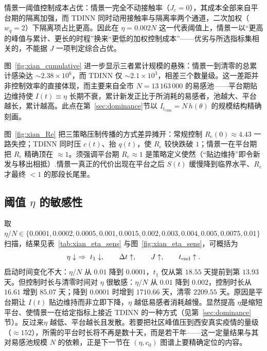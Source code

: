 \documentclass[lang=cn,a4paper,newtx]{elegantpaper}
\numberwithin{equation}{section}
\theoremstyle{plain}
\newcommand{\Itcum}{I_{t_{\mathrm{cum}}}}
\begin{document}
情景一阈值控制成本占优：情景一完全不动接触率（$J_c=0$），其成本全部来自平台期的隔离加强，而 TDINN 同时动用接触率与隔离率两个通道，二次加权（$w_q=2$）下隔离项占比更高。因此在 $\eta=0.002N$ 这一代表阈值上，情景一以“更高的峰值与累计、更长的时程”换来“更低的加权控制成本”——优劣与所选指标集相关的，不能据 $J$ 一项判定综合占优。

图~\ref{fig:xian_cumulative} 进一步显示三者累计规模的悬殊：情景一到清零的总累计感染达 $\sim2.38\times10^{6}$，而 TDINN 仅 $\sim2.1\times10^{3}$，相差三个数量级。这一差距并非控制效率的直接体现，而主要来自全市 $N=13\,163\,000$ 的易感池——平台期贴边维持使 $I(t)\equiv\eta$ 长期不衰，累计新发正比于所消耗的易感者，池越大、平台越长，累计越高。此点在第~\ref{sec:dominance}节以 $\Itcum=N\,h(\theta)$ 的规模结构精确刻画。

图~\ref{fig:xian_Re} 把三策略压制传播的方式差异摊开：常规控制 $R_e(0)\approx4.43$ 一路失控；TDINN 同时压 $c(t)$、抬 $q(t)$，使 $R_e$ 较快跌破 $1$；情景一在平台期把 $R_e$ 精确顶在 $\approx1$。须强调平台期 $R_e\approx1$ 是策略定义使然（“贴边维持”即令新发与移出相抵）.情景一真正的代价出现在平台之后 $S(t)$ 缓慢降到临界水平、$R_e$ 才最终 $<1$ 的那段长尾里。

\subsection{阈值 \texorpdfstring{$\eta$}{eta} 的敏感性}
取 $\eta/N\in\{0.0001,0.0002,0.0005,0.001,0.0015,0.002,0.003,0.004,0.005,0.0075,0.01\}$ 扫描，结果见表~\ref{tab:xian_eta_sens} 与图~\ref{fig:xian_eta_sens}，可概括为
\[
\eta\downarrow\ \Rightarrow\ t_1\downarrow,\qquad \Delta t\uparrow,\qquad J\uparrow,\qquad t_{\rm end}\uparrow.
\]
启动时间变化不大：$\eta/N$ 从 $0.01$ 降到 $0.0001$，$t_1$ 仅从第 $18.55$ 天提前到第 $13.93$ 天。但控制时长与清零时间对 $\eta$ 很敏感：$\eta/N$ 从 $0.01$ 降到 $0.002$，控制时长从 $16.61$ 增到 $85.07$ 天；降到 $0.0001$ 时增到 $1710.66$ 天，清零 $2209.55$ 天。原因是平台期让 $I(t)$ 贴边维持而非立即下降，$\eta$ 越低易感者消耗越慢。显然提高 $\eta$是缩短平台、使情景一在给定指标上接近 TDINN 的一种方式（见第~\ref{sec:dominance}节）。反过来$\eta$ 越低、平台越长且发散。若要把社区峰值压到西安真实疫情的量级（$\approx152$），所需的平台时长将不再是数十天，而是若干年——这一定量结果与其对易感池规模 $N$ 的依赖，正是下一节在 $(\eta,c_0)$ 图谱上要精确定位的内容。

\begin{table}[htbp]
    \centering
    \footnotesize
    \caption{不同医疗阈值 $\eta$ 下情景一阈值控制的数值指标。}
    \label{tab:xian_eta_sens}
    \resizebox{0.7\textwidth}{!}{}
\end{table}
\end{document}
